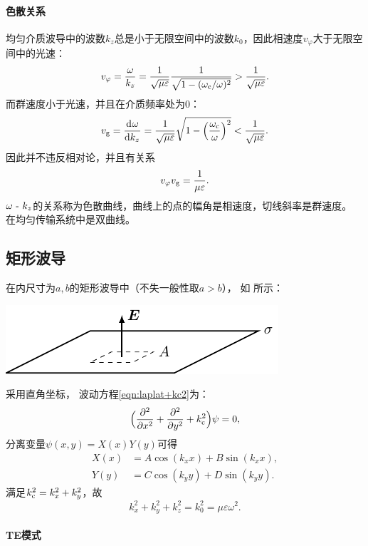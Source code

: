 \paragraph{色散关系}

均匀介质波导中的波数$k_z$总是小于无限空间中的波数$k_0$，因此相速度$v_\varphi$大于无限空间中的光速：
\[
    v_\varphi=\frac\omega{k_z}=\frac1{\sqrt{\mu\varepsilon}}\frac1{\sqrt{1-(\omega\c/\omega)^2}}>\frac1{\sqrt{\mu\varepsilon}}.
\]
而群速度小于光速，并且在介质频率处为0：
\[
    v_\text g=\dv\omega{k_z}=\frac1{\sqrt{\mu\varepsilon}}\sqrt{1-\Bigkh{\frac{\omega\c}\omega}^2}<\frac1{\sqrt{\mu\varepsilon}}.
\]
因此并不违反相对论，并且有关系
\begin{equation}
    v_\varphi v_\text g=\frac1{\mu\varepsilon}.
\end{equation}
$\omega\vs k_z$的关系称为色散曲线，曲线上的点的幅角是相速度，切线斜率是群速度。
在均匀传输系统中是双曲线。

\subsection{矩形波导}
\label{ssec:rectangular waveguide}

在内尺寸为$a,b$的矩形波导中（不失一般性取$a>b$），
如 所示：
\begin{center}
    \includegraphics[page=27]{figures/tikz/layouts.pdf}
    \label{fig:rectangle waveguide}
\end{center}
采用直角坐标，
波动方程\eqref{eqn:laplat+kc2}为：
\begin{equation}
    \Bigkh{\pp[2]x+\pp[2]y+k\c^2}\psi=0,
\end{equation}
分离变量$\psi(x,y)=X(x)Y(y)$可得
\begin{align*}
    X(x)&=A\cos(k_xx)+B\sin(k_xx),\\
    Y(y)&=C\cos(k_yy)+D\sin(k_yy).
\end{align*}
满足$k\c^2=k_x^2+k_y^2$，故
\begin{equation}
    k_x^2+k_y^2+k_z^2=k_0^2=\mu\varepsilon\omega^2.
\end{equation}

\paragraph{TE模式}

